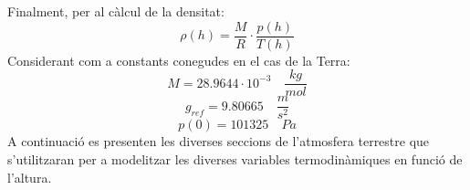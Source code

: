 Finalment, per al càlcul de la densitat:
\begin{equation}
    \rho(h) = \frac{M}{R} \cdot \frac{p(h)}{T(h)}
\end{equation}
Considerant com a constants conegudes en el cas de la Terra:
\begin{equation}
    M = 28.9644 \cdot 10^{-3} \quad \frac{kg}{mol}
\end{equation}
\begin{equation}
    g_{ref} = 9.80665 \quad {\frac{m}{s^2}}
\end{equation}
\begin{equation}
    p(0) = 101325 \quad Pa
\end{equation}
A continuació es presenten les diverses seccions de l'atmosfera terrestre que s'utilitzaran per a modelitzar les diverses variables termodinàmiques en funció de l'altura.

